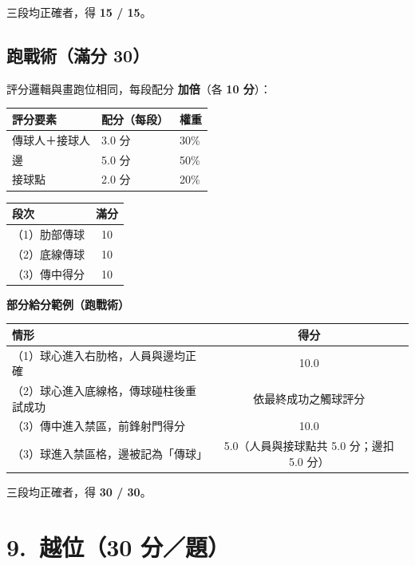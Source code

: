 \documentclass[11pt]{article}
\newcommand{\term}[1]{\textbf{#1}}
\begin{document}
\vspace{0.4em}
\noindent
三段均正確者，得 \textbf{15 / 15}。

\subsection*{跑戰術（滿分 30）}

評分邏輯與畫跑位相同，每段配分 \term{加倍}（各 \term{10 分}）：

\vspace{0.3em}
\begin{tabular}{@{}lll@{}}
\toprule
\textbf{評分要素} & \textbf{配分（每段）} & \textbf{權重} \\
\midrule
傳球人＋接球人 & 3.0 分 & 30\% \\
邊 & 5.0 分 & 50\% \\
接球點 & 2.0 分 & 20\% \\
\bottomrule
\end{tabular}

\vspace{0.5em}
\begin{tabular}{@{}lc@{}}
\toprule
\textbf{段次} & \textbf{滿分} \\
\midrule
（1）肋部傳球 & 10 \\
（2）底線傳球 & 10 \\
（3）傳中得分 & 10 \\
\bottomrule
\end{tabular}

\vspace{0.6em}
\noindent\textbf{部分給分範例（跑戰術）}

\small
\begin{tabular}{@{}p{7.5cm}c@{}}
\toprule
\textbf{情形} & \textbf{得分} \\
\midrule
（1）球心進入右肋格，人員與邊均正確 & 10.0 \\
（2）球心進入底線格，傳球碰柱後重試成功 & 依最終成功之觸球評分 \\
（3）傳中進入禁區，前鋒射門得分 & 10.0 \\
（3）球進入禁區格，邊被記為「傳球」 & 5.0（人員與接球點共 5.0 分；邊扣 5.0 分） \\
\bottomrule
\end{tabular}
\normalsize

\vspace{0.4em}
\noindent
三段均正確者，得 \textbf{30 / 30}。

\section*{9.\ 越位（30 分／題）}
\end{document}
